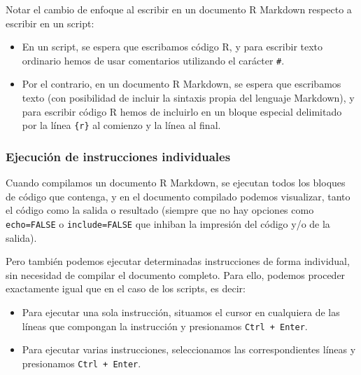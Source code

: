 \documentclass[
  title=normal,
  notoc,
  bib=normal]{mnye}
\begin{document}
\begin{infobox}

Notar el cambio de enfoque al escribir en un documento R Markdown respecto a escribir en un script:

\begin{itemize}
\item
  En un script, se espera que escribamos código \textsf{R}, y para escribir texto ordinario hemos de usar comentarios utilizando el carácter \texttt{\#}.
\item
  Por el contrario, en un documento R Markdown, se espera que escribamos texto (con posibilidad de incluir la sintaxis propia del lenguaje Markdown), y para escribir código \textsf{R} hemos de incluirlo en un bloque especial delimitado por la línea \texttt{\textasciigrave{}\textasciigrave{}\textasciigrave{}\{r\}} al comienzo y la línea \texttt{\textasciigrave{}\textasciigrave{}\textasciigrave{}} al final.
\end{itemize}

\end{infobox}

\hypertarget{ejecuciuxf3n-de-instrucciones-individuales}{%
\subsubsection{Ejecución de instrucciones individuales}\label{ejecuciuxf3n-de-instrucciones-individuales}}

Cuando compilamos un documento R Markdown, se ejecutan todos los bloques de código que contenga, y en el documento compilado podemos visualizar, tanto el código como la salida o resultado (siempre que no hay opciones como \texttt{echo=FALSE} o \texttt{include=FALSE} que inhiban la impresión del código y/o de la salida).

Pero también podemos ejecutar determinadas instrucciones de forma individual, sin necesidad de compilar el documento completo.
Para ello, podemos proceder exactamente igual que en el caso de los scripts, es decir:

\begin{itemize}
\item
  Para ejecutar una sola instrucción, situamos el cursor en cualquiera de las líneas que compongan la instrucción y presionamos \texttt{Ctrl\ +\ Enter}.
\item
  Para ejecutar varias instrucciones, seleccionamos las correspondientes líneas y presionamos \texttt{Ctrl\ +\ Enter}.
\end{itemize}
\end{document}
